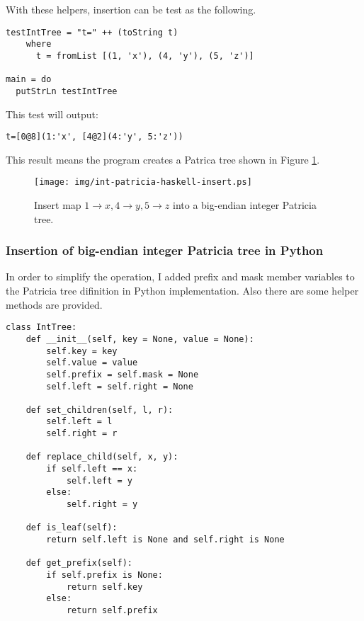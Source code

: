\documentclass{article}
\begin{document}
With these helpers, insertion can be test as the following.

\begin{lstlisting}
testIntTree = "t=" ++ (toString t) 
    where
      t = fromList [(1, 'x'), (4, 'y'), (5, 'z')]

main = do
  putStrLn testIntTree
\end{lstlisting}

This test will output:

\begin{verbatim}
t=[0@8](1:'x', [4@2](4:'y', 5:'z'))
\end{verbatim}

This result means the program creates a Patrica tree shown in Figure \ref{fig:int-patricia-haskell-insert}.

\begin{figure}[htbp]
       \begin{center}
	\texttt{[image: img/int-patricia-haskell-insert.ps]}
        \caption{Insert map $1 \rightarrow x, 4 \rightarrow y, 5 \rightarrow z$ into a big-endian integer Patricia tree.}
        \label{fig:int-patricia-haskell-insert}
       \end{center}
\end{figure}

\subsubsection*{Insertion of big-endian integer Patricia tree in Python}
In order to simplify the operation, I added prefix and mask member
variables to the Patricia tree difinition in Python
implementation. Also there are some helper methods are provided.

\lstset{language=Python}
\begin{lstlisting}
class IntTree:
    def __init__(self, key = None, value = None):
        self.key = key
        self.value = value
        self.prefix = self.mask = None
        self.left = self.right = None

    def set_children(self, l, r):
        self.left = l
        self.right = r

    def replace_child(self, x, y):
        if self.left == x:
            self.left = y
        else:
            self.right = y

    def is_leaf(self):
        return self.left is None and self.right is None

    def get_prefix(self):
        if self.prefix is None:
            return self.key
        else:
            return self.prefix
\end{lstlisting}
\end{document}
